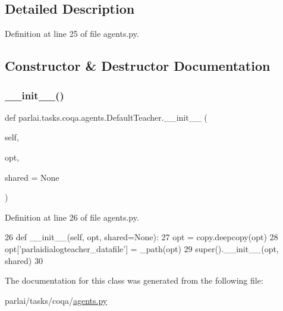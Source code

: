 \subsection{Detailed Description}


Definition at line 25 of file agents.\+py.



\subsection{Constructor \& Destructor Documentation}
\mbox{\label{classparlai_1_1tasks_1_1coqa_1_1agents_1_1DefaultTeacher_a62b634fe9152617c94604f39ff7851a1}} 
\subsubsection{\texorpdfstring{\+\_\+\+\_\+init\+\_\+\+\_\+()}{\_\_init\_\_()}}
{\footnotesize\ttfamily def parlai.\+tasks.\+coqa.\+agents.\+Default\+Teacher.\+\_\+\+\_\+init\+\_\+\+\_\+ (\begin{DoxyParamCaption}\item[{}]{self,  }\item[{}]{opt,  }\item[{}]{shared = {\ttfamily None} }\end{DoxyParamCaption})}



Definition at line 26 of file agents.\+py.


\begin{DoxyCode}
26     \textcolor{keyword}{def }\_\_init\_\_(self, opt, shared=None):
27         opt = copy.deepcopy(opt)
28         opt[\textcolor{stringliteral}{'parlaidialogteacher\_datafile'}] = \_path(opt)
29         super().\_\_init\_\_(opt, shared)
30 \end{DoxyCode}


The documentation for this class was generated from the following file\+:\begin{DoxyCompactItemize}
\item 
parlai/tasks/coqa/\hyperlink{parlai_2tasks_2coqa_2agents_8py}{agents.\+py}\end{DoxyCompactItemize}
